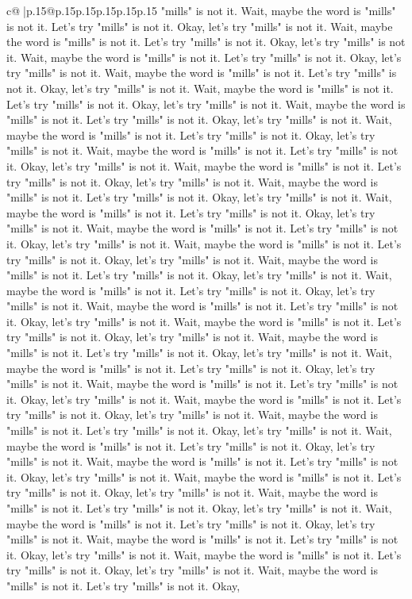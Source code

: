 \documentclass{article}
\begin{document}
{\begin{supertabular}{c@{$\;$}|p{.15\linewidth}@{}p{.15\linewidth}p{.15\linewidth}p{.15\linewidth}p{.15\linewidth}p{.15\linewidth}}
{{{"mills" is not it. Wait, maybe the word is "mills" is not it. Let's try "mills" is not it. Okay, let's try "mills" is not it. Wait, maybe the word is "mills" is not it. Let's try "mills" is not it. Okay, let's try "mills" is not it. Wait, maybe the word is "mills" is not it. Let's try "mills" is not it. Okay, let's try "mills" is not it. Wait, maybe the word is "mills" is not it. Let's try "mills" is not it. Okay, let's try "mills" is not it. Wait, maybe the word is "mills" is not it. Let's try "mills" is not it. Okay, let's try "mills" is not it. Wait, maybe the word is "mills" is not it. Let's try "mills" is not it. Okay, let's try "mills" is not it. Wait, maybe the word is "mills" is not it. Let's try "mills" is not it. Okay, let's try "mills" is not it. Wait, maybe the word is "mills" is not it. Let's try "mills" is not it. Okay, let's try "mills" is not it. Wait, maybe the word is "mills" is not it. Let's try "mills" is not it. Okay, let's try "mills" is not it. Wait, maybe the word is "mills" is not it. Let's try "mills" is not it. Okay, let's try "mills" is not it. Wait, maybe the word is "mills" is not it. Let's try "mills" is not it. Okay, let's try "mills" is not it. Wait, maybe the word is "mills" is not it. Let's try "mills" is not it. Okay, let's try "mills" is not it. Wait, maybe the word is "mills" is not it. Let's try "mills" is not it. Okay, let's try "mills" is not it. Wait, maybe the word is "mills" is not it. Let's try "mills" is not it. Okay, let's try "mills" is not it. Wait, maybe the word is "mills" is not it. Let's try "mills" is not it. Okay, let's try "mills" is not it. Wait, maybe the word is "mills" is not it. Let's try "mills" is not it. Okay, let's try "mills" is not it. Wait, maybe the word is "mills" is not it. Let's try "mills" is not it. Okay, let's try "mills" is not it. Wait, maybe the word is "mills" is not it. Let's try "mills" is not it. Okay, let's try "mills" is not it. Wait, maybe the word is "mills" is not it. Let's try "mills" is not it. Okay, let's try "mills" is not it. Wait, maybe the word is "mills" is not it. Let's try "mills" is not it. Okay, let's try "mills" is not it. Wait, maybe the word is "mills" is not it. Let's try "mills" is not it. Okay, let's try "mills" is not it. Wait, maybe the word is "mills" is not it. Let's try "mills" is not it. Okay, let's try "mills" is not it. Wait, maybe the word is "mills" is not it. Let's try "mills" is not it. Okay, let's try "mills" is not it. Wait, maybe the word is "mills" is not it. Let's try "mills" is not it. Okay, let's try "mills" is not it. Wait, maybe the word is "mills" is not it. Let's try "mills" is not it. Okay, let's try "mills" is not it. Wait, maybe the word is "mills" is not it. Let's try "mills" is not it. Okay, let's try "mills" is not it. Wait, maybe the word is "mills" is not it. Let's try "mills" is not it. Okay, let's try "mills" is not it. Wait, maybe the word is "mills" is not it. Let's try "mills" is not it. Okay, let's try "mills" is not it. Wait, maybe the word is "mills" is not it. Let's try "mills" is not it. Okay, let's try "mills" is not it. Wait, maybe the word is "mills" is not it. Let's try "mills" is not it. Okay, }}}
\end{supertabular}}
\end{document}
